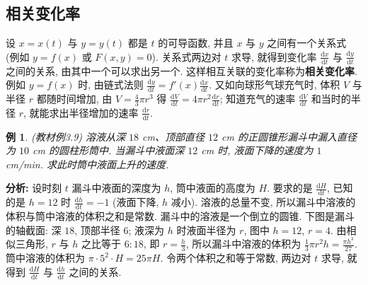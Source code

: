 \documentclass[UTF8,openany]{ctexbook}
\theoremstyle{chinesetextbook}
\newtheorem{example}{例}[section]
\newcommand{\dd}{\mathrm d}
\begin{document}
\subsection{相关变化率}
设 $x=x(t)$ 与 $y=y(t)$ 都是 $t$ 的可导函数, 并且 $x$ 与 $y$ 之间有一个关系式 (例如 $y=f(x)$ 或 $F(x,y)=0$). 关系式两边对 $t$ 求导, 就得到变化率 $\displaystyle\frac{\dd x}{\dd t}$ 与 $\displaystyle\frac{\dd y}{\dd t}$ 之间的关系, 由其中一个可以求出另一个. 这样相互关联的变化率称为\textbf{相关变化率}. 例如 $y=f(x)$ 时, 由链式法则 $\displaystyle\frac{\dd y}{\dd t}=f'(x)\frac{\dd x}{\dd t}$. 又如向球形气球充气时, 体积 $V$ 与半径 $r$ 都随时间增加, 由 $\displaystyle V=\frac43\pi r^3$ 得 $\displaystyle\frac{\dd V}{\dd t}=4\pi r^2\frac{\dd r}{\dd t}$; 知道充气的速率 $\displaystyle\frac{\dd V}{\dd t}$ 和当时的半径 $r$, 就能求出半径增加的速率 $\displaystyle\frac{\dd r}{\dd t}$.
\begin{example}\label{ex:c2-3-9}
\textnormal{(教材例3.9)} 溶液从深 $18$ cm、顶部直径 $12$ cm 的正圆锥形漏斗中漏入直径为 $10$ cm 的圆柱形筒中. 当漏斗中液面深 $12$ cm 时, 液面下降的速度为 $1$ cm/min. 求此时筒中液面上升的速度.
\end{example}
\par\indent\textbf{分析:} 设时刻 $t$ 漏斗中液面的深度为 $h$, 筒中液面的高度为 $H$. 要求的是 $\displaystyle\frac{\dd H}{\dd t}$, 已知的是 $h=12$ 时 $\displaystyle\frac{\dd h}{\dd t}=-1$ (液面下降, $h$ 减小). 溶液的总量不变, 所以漏斗中溶液的体积与筒中溶液的体积之和是常数. 漏斗中的溶液是一个倒立的圆锥. 下图是漏斗的轴截面: 深 $18$, 顶部半径 $6$; 液深为 $h$ 时液面半径为 $r$, 图中 $h=12$, $r=4$. 由相似三角形, $r$ 与 $h$ 之比等于 $6:18$, 即 $\displaystyle r=\frac h3$, 所以漏斗中溶液的体积为 $\displaystyle\frac13\pi r^2h=\frac{\pi h^3}{27}$. 筒中溶液的体积为 $\pi\cdot5^2\cdot H=25\pi H$. 令两个体积之和等于常数, 两边对 $t$ 求导, 就得到 $\displaystyle\frac{\dd H}{\dd t}$ 与 $\displaystyle\frac{\dd h}{\dd t}$ 之间的关系.
\begin{center}
\end{center}
\end{document}
